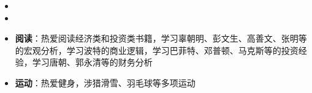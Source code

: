   \begin{itemize}[leftmargin=*]
    \item
    \item
  \end{itemize}


\begin{itemize}[leftmargin=*]
  \item \textbf{阅读}：热爱阅读经济类和投资类书籍，学习辜朝明、彭文生、高善文、张明等的宏观分析，学习波特的商业逻辑，学习巴菲特、邓普顿、马克斯等的投资经验，学习唐朝、郭永清等的财务分析
  \item \textbf{运动}：热爱健身，涉猎滑雪、羽毛球等多项运动
\end{itemize}